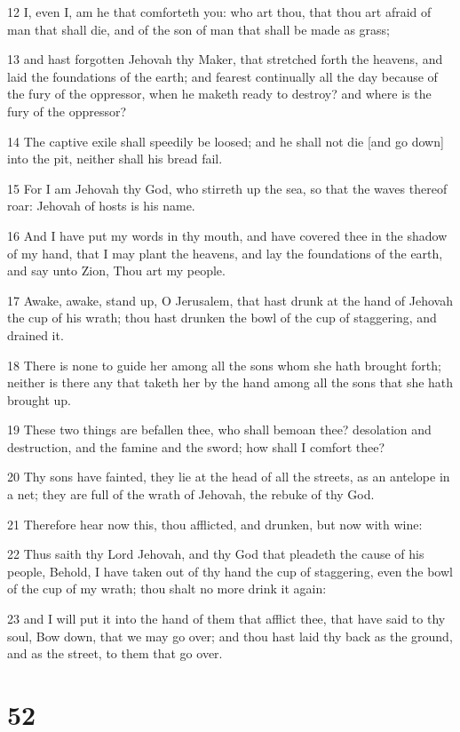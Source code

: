 \par 12 I, even I, am he that comforteth you: who art thou, that thou art afraid of man that shall die, and of the son of man that shall be made as grass;
\par 13 and hast forgotten Jehovah thy Maker, that stretched forth the heavens, and laid the foundations of the earth; and fearest continually all the day because of the fury of the oppressor, when he maketh ready to destroy? and where is the fury of the oppressor?
\par 14 The captive exile shall speedily be loosed; and he shall not die [and go down] into the pit, neither shall his bread fail.
\par 15 For I am Jehovah thy God, who stirreth up the sea, so that the waves thereof roar: Jehovah of hosts is his name.
\par 16 And I have put my words in thy mouth, and have covered thee in the shadow of my hand, that I may plant the heavens, and lay the foundations of the earth, and say unto Zion, Thou art my people.
\par 17 Awake, awake, stand up, O Jerusalem, that hast drunk at the hand of Jehovah the cup of his wrath; thou hast drunken the bowl of the cup of staggering, and drained it.
\par 18 There is none to guide her among all the sons whom she hath brought forth; neither is there any that taketh her by the hand among all the sons that she hath brought up.
\par 19 These two things are befallen thee, who shall bemoan thee? desolation and destruction, and the famine and the sword; how shall I comfort thee?
\par 20 Thy sons have fainted, they lie at the head of all the streets, as an antelope in a net; they are full of the wrath of Jehovah, the rebuke of thy God.
\par 21 Therefore hear now this, thou afflicted, and drunken, but now with wine:
\par 22 Thus saith thy Lord Jehovah, and thy God that pleadeth the cause of his people, Behold, I have taken out of thy hand the cup of staggering, even the bowl of the cup of my wrath; thou shalt no more drink it again:
\par 23 and I will put it into the hand of them that afflict thee, that have said to thy soul, Bow down, that we may go over; and thou hast laid thy back as the ground, and as the street, to them that go over.

\chapter{52}

